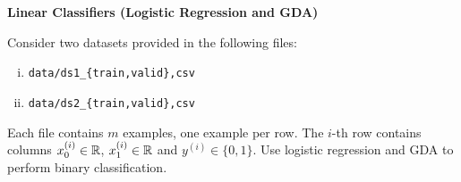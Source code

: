 \documentclass[12pt,letterpaper,boxed]{hmcpset}
\newcommand{\yy}{y^{(i)}}
\newcommand{\xx}{x^{(i)}}
\begin{document}

\begin{problem} [Problem 1]
    \textbf{Linear Classifiers (Logistic Regression and GDA)}
    
    Consider two datasets provided in the following files:
    \begin{enumerate}[i.]
    	\item \verb*|data/ds1_{train,valid},csv|
    	\item \verb*|data/ds2_{train,valid},csv|
    \end{enumerate}
	Each file contains $m$ examples, one example per row. The $i$-th row contains columns $\xx_0 \in \R$, $\xx_1 \in \R$ and $\yy \in \{0, 1\}$. Use logistic regression and GDA to perform binary classification. 
\end{problem}
\end{document}
